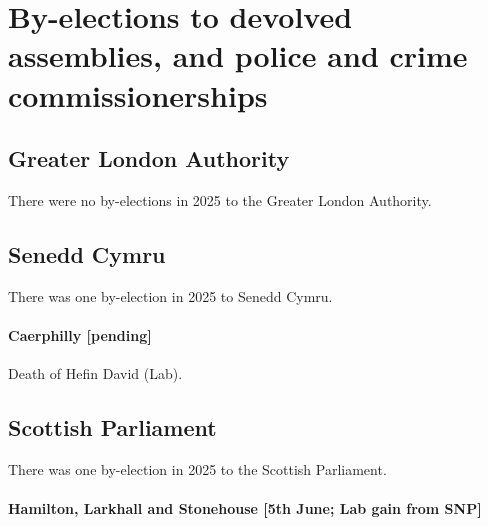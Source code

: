 \documentclass[a4paper,openany]{book}
\begin{document}
\chapter{By-elections to devolved assemblies, and police and crime commissionerships}

\section{Greater London Authority}

There were no by-elections in 2025 to the Greater London Authority.


\section{Senedd Cymru}

There was one by-election in 2025 to Senedd Cymru.

\subsubsection*{Caerphilly \hspace*{\fill}\nolinebreak[1]%
	\enspace\hspace*{\fill}
	[pending]}


Death of Hefin David (Lab).


\section{Scottish Parliament}

There was one by-election in 2025 to the Scottish Parliament.

\subsubsection*{Hamilton, Larkhall and Stonehouse \hspace*{\fill}\nolinebreak[1]%
\enspace\hspace*{\fill}
[5th June; Lab gain from SNP]}
\end{document}
